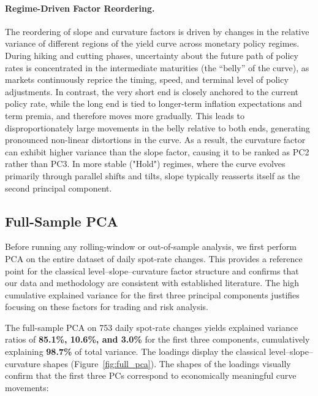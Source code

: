 \documentclass[11pt,a4paper]{article}
\begin{document}
\paragraph{Regime-Driven Factor Reordering.}
The reordering of slope and curvature factors is driven by changes in the
relative variance of different regions of the yield curve across monetary
policy regimes. During hiking and cutting phases, uncertainty about the
future path of policy rates is concentrated in the intermediate maturities
(the ``belly'' of the curve), as markets continuously reprice the timing,
speed, and terminal level of policy adjustments. In contrast, the very
short end is closely anchored to the current policy rate, while the long
end is tied to longer-term inflation expectations and term premia, and
therefore moves more gradually. This leads to disproportionately large
movements in the belly relative to both ends, generating pronounced
non-linear distortions in the curve. As a result, the curvature factor
can exhibit higher variance than the slope factor, causing it to be
ranked as PC2 rather than PC3. In more stable ("Hold") regimes, where the curve
evolves primarily through parallel shifts and tilts, slope typically
reasserts itself as the second principal component.

\subsection{Full-Sample PCA}
Before running any rolling-window or out-of-sample analysis, we first perform PCA on the entire dataset of daily spot-rate changes. This provides a reference point for the classical level--slope--curvature factor structure and confirms that our data and methodology are consistent with established literature. The high cumulative explained variance for the first three principal components justifies focusing on these factors for trading and risk analysis.

The full-sample PCA on 753 daily spot-rate changes yields explained
variance ratios of \textbf{85.1\%, 10.6\%, and 3.0\%} for the first
three components, cumulatively explaining \textbf{98.7\%} of total
variance. The loadings display the classical level--slope--curvature
shapes (Figure~\ref{fig:full_pca}). The shapes of the loadings visually confirm that the first three PCs correspond to economically meaningful curve movements:
\end{document}
